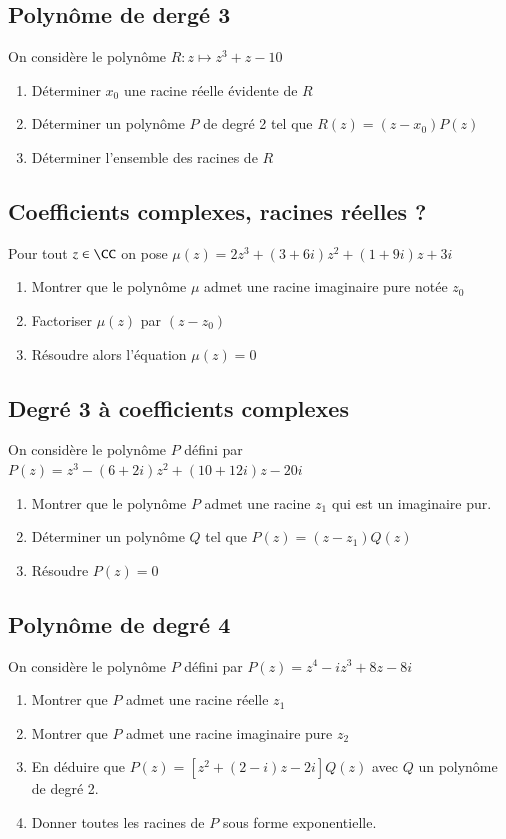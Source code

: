 \documentclass[oneside,12pt]{article}          %
\begin{document}
\subsection{Polynôme de dergé 3}
On considère le polynôme $R:z\mapsto z^3+z-10$
\begin{enumerate}
	\item Déterminer $x_0$ une racine réelle évidente de $R$
	\item Déterminer un polynôme $P$ de degré 2 tel que $R(z)=(z-x_0)P(z)$
	\item Déterminer l'ensemble des racines de $R$
\end{enumerate}


\subsection{Coefficients complexes, racines réelles ?}
Pour tout $z\in\CC$  on pose $\mu(z)=2z^3+(3+6i)z^2+(1+9i)z+3i$
\begin{enumerate}
	\item Montrer que le polynôme $\mu$ admet une racine imaginaire pure notée $z_0$
	\item Factoriser $\mu(z)$ par $(z-z_0)$
	\item Résoudre alors l'équation $\mu(z)=0$
\end{enumerate}



\subsection{Degré 3 à coefficients complexes}
On considère le polynôme $P$ défini par $P(z)=z^3-(6+2i)z^2+(10+12i)z-20i$
\begin{enumerate}
    \item Montrer que le polynôme $P$ admet une racine $z_1$ qui est un imaginaire pur.
    \item Déterminer un polynôme $Q$ tel que $P(z)=(z-z_1)Q(z)$
    \item Résoudre $P(z)=0$
\end{enumerate}



\subsection{Polynôme de degré 4}
On considère le polynôme $P$ défini par $P(z)=z^4-iz^3+8z-8i$
\begin{enumerate}
	\item Montrer que $P$ admet une racine réelle $z_1$
	\item Montrer que $P$ admet une racine imaginaire pure $z_2$
	\item En déduire que $P(z)=\left[z^2+(2-i)z-2i\right]Q(z)$ avec $Q$ un polynôme de degré 2.
	\item Donner toutes les racines de $P$ sous forme exponentielle. 
\end{enumerate}
\end{document}

